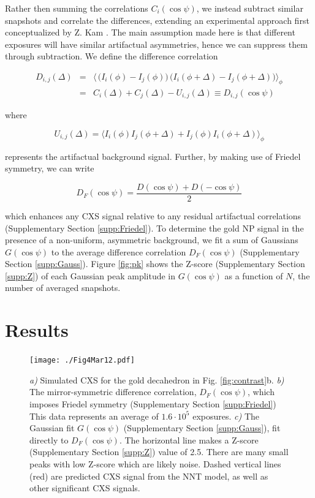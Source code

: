 \documentclass [12pt,fleqn]{article}
\def \be {\begin{equation}}
\def \ee {\end{equation}}
\def \beq {\begin{eqnarray}}
\def \eeq {\end{eqnarray}}
\begin{document}
Rather then summing the correlations $C_i(\cos \psi)$, we instead subtract similar snapshots and correlate the differences, extending an experimental approach first conceptualized by Z. Kam \cite{kam1981fluctuation}. The main assumption made here is that different exposures will have similar artifactual asymmetries, hence we can suppress them through subtraction. We define the difference correlation

\beq \label{difcorz}
D_{i,j}(\Delta) &=& \big \langle  \,\big(  I_i(\phi)-I_j(\phi) \big)\,\big( I_i( \phi + \Delta) - I_j( \phi+\Delta) \big) \big \rangle _{\phi}\\ \nonumber
&=& C_i(\Delta) + C_j(\Delta) - U_{i,j}(\Delta) \equiv D_{i,j}(\cos \psi)
\eeq

where

\be
U_{i,j}(\Delta) =  \big \langle  I_i(\phi)I_j(\phi+\Delta)  +  I_j( \phi) I_i( \phi+\Delta)\big \rangle _{\phi}
\ee

represents the artifactual background signal. Further, by making use of Friedel symmetry, we can write

\be \label{DF}
D_F(\cos \psi) = \frac{D(\cos \psi) + D(-\cos \psi)}{2}
\ee

which enhances any CXS signal relative to any residual artifactual correlations (Supplementary Section \ref{supp:Friedel}). To determine the gold NP signal in the presence of a non-uniform, asymmetric background, we fit a sum of Gaussians $G(\cos \psi)$ to the average difference correlation $D_F(\cos \psi)$ (Supplementary Section \ref{supp:Gauss}).  Figure \ref{fig:pk} shows the Z-score (Supplementary Section \ref{supp:Z}) of each Gaussian peak amplitude in $G(\cos \psi)$ as a function of $N$, the number of averaged snapshots.

\section{Results}
\begin{figure}[H]
\centering
\texttt{[image: ./Fig4Mar12.pdf]}
\caption{\emph{a)} Simulated CXS for the gold decahedron in Fig. \ref{fig:contrast}b. \emph{b)} The mirror-symmetric difference correlation, $D_F(\cos \psi)$, which imposes Friedel symmetry (Supplementary Section \ref{supp:Friedel}) This data represents an average of $1.6\cdot 10^5$ exposures. \emph{c)} The Gaussian fit $G(\cos \psi)$ (Supplementary Section \ref{supp:Gauss}), fit directly to $D_F(\cos \psi)$. The horizontal line makes a Z-score (Supplementary Section \ref{supp:Z}) value of 2.5. There are many small peaks with low Z-score which are likely noise. Dashed vertical lines (red) are predicted CXS signal from the NNT model, as well as other significant CXS signals. }
\label{fig:Main_result}
\end{figure}
\end{document}
